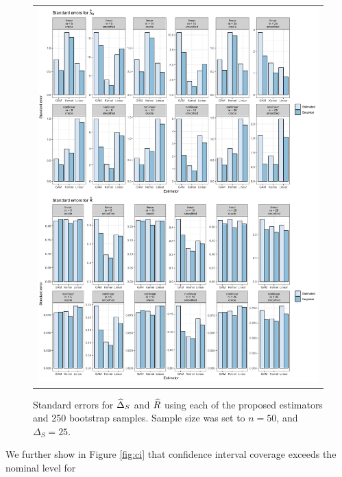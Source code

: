 \documentclass[useAMS,usenatbib,referee]{biom}
\begin{document}
\begin{figure}
\centering
\begin{tabular}{c}
\includegraphics[width =\textwidth]{results/standard-error-figure.png}
\end{tabular}\vspace{0.2in}
\caption{Standard errors for ${\widehat\Delta}_S$ and ${\widehat R}$ using each of the proposed estimators and 250 bootstrap samples. Sample size was set to $n = 50$, and $\Delta_S = 25$.}\label{fig:se}
\end{figure}

We further show in Figure \ref{fig:ci} that confidence interval coverage exceeds the nominal level for 
\end{document}
